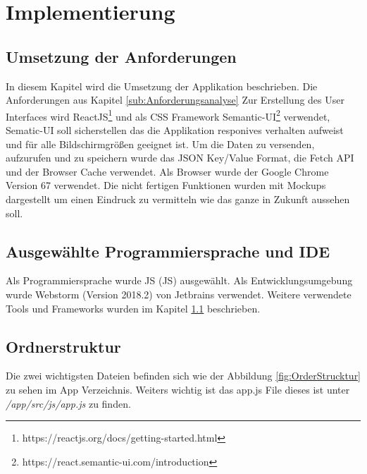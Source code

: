 \chapter{Implementierung}\label{chap:Implementierung}
\thispagestyle{standard}
\pagestyle{standard}

\section{Umsetzung der Anforderungen}\label{sub:Umsetzung der Anforderungen}
In diesem Kapitel wird die Umsetzung der Applikation beschrieben. Die Anforderungen aus Kapitel \ref{sub:Anforderungsanalyse}
Zur Erstellung des User Interfaces wird ReactJS\footnote{https://reactjs.org/docs/getting-started.html} und als CSS Framework Semantic-UI\footnote{https://react.semantic-ui.com/introduction} verwendet, Sematic-UI soll sicherstellen das die Applikation responives verhalten aufweist und für alle Bildschirmgrößen geeignet ist. Um die Daten zu versenden, aufzurufen und zu speichern wurde das JSON Key/Value Format, die Fetch API und der Browser Cache verwendet.
Als Browser wurde der Google Chrome Version 67 verwendet.
Die nicht fertigen Funktionen wurden mit Mockups dargestellt um einen Eindruck zu vermitteln wie das ganze in Zukunft aussehen soll.

\section{Ausgewählte Programmiersprache und IDE}
Als Programmiersprache wurde \acl{JS} (\acs{JS}) ausgewählt. 
Als Entwicklungsumgebung wurde Webstorm (Version 2018.2) von Jetbrains verwendet. 
Weitere verwendete Tools und Frameworks wurden im Kapitel \ref{sub:Umsetzung der Anforderungen} beschrieben.
\newpage
\section{Ordnerstruktur}
Die zwei wichtigsten Dateien befinden sich wie der Abbildung \ref{fig:OrderStrucktur} zu sehen im App Verzeichnis.
Weiters wichtig ist das app.js File dieses ist unter \textit{/app/src/js/app.js} zu finden.

